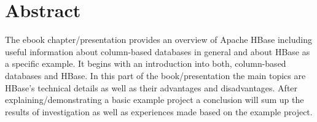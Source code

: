 
\chapter{Abstract}
The ebook chapter/presentation provides an overview of Apache HBase including useful information about column-based databases in general and about HBase as a specific example. It begins with an introduction into both, column-based databases and HBase. In this part of the book/presentation the main topics are HBase's technical details as well as their advantages and disadvantages. After explaining/demonstrating a basic example project a conclusion will sum up the results of investigation as well as experiences made based on the example project. 
